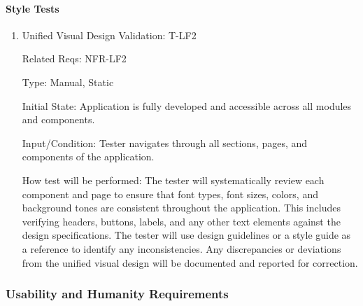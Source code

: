 \documentclass[12pt, titlepage]{article}
\begin{document}
\paragraph{Style Tests}
\begin{enumerate}
\item{Unified Visual Design Validation: T-LF2\\}

Related Reqs: NFR-LF2

Type: Manual, Static

Initial State: Application is fully developed and accessible across all modules and components.

Input/Condition: Tester navigates through all sections, pages, and components of the application.

How test will be performed: The tester will systematically review each component and page to ensure that font types, font sizes, colors, and background tones are consistent throughout the application. This includes verifying headers, buttons, labels, and any other text elements against the design specifications. The tester will use design guidelines or a style guide as a reference to identify any inconsistencies. Any discrepancies or deviations from the unified visual design will be documented and reported for correction.
\end{enumerate}











\subsubsection{Usability and Humanity Requirements}
\end{document}
